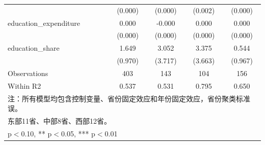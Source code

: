 \begin{table}[htbp]
\begin{tabular}{l*{4}{c}}
                    &     (0.000)         &     (0.000)         &     (0.002)         &     (0.000)         \\
\addlinespace
education\_expenditure&       0.000         &      -0.000\sym{**} &       0.000         &       0.000         \\
                    &     (0.000)         &     (0.000)         &     (0.000)         &     (0.000)         \\
\addlinespace
education\_share     &       1.649\sym{*}  &       3.052         &       3.375         &       0.544         \\
                    &     (0.970)         &     (3.717)         &     (3.663)         &     (0.967)         \\
\midrule
Observations        &         403         &         143         &         104         &         156         \\
Within R2           &       0.537         &       0.531         &       0.795         &       0.650         \\
\bottomrule
\multicolumn{5}{l}{\footnotesize 注：所有模型均包含控制变量、省份固定效应和年份固定效应，省份聚类标准误。}\\
\multicolumn{5}{l}{\footnotesize 东部11省、中部8省、西部12省。}\\
\multicolumn{5}{l}{\footnotesize * p$<$0.10, ** p$<$0.05, *** p$<$0.01}\\
\end{tabular}
\end{table}

